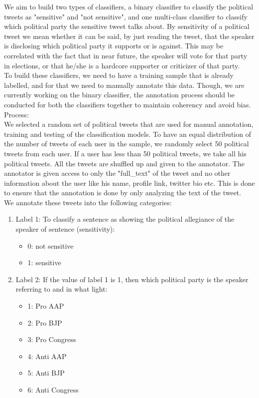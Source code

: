 \documentclass[a4paper,11pt]{article}
\begin{document}
We aim to build two types of classifiers, a binary classifier to classify the political tweets as "sensitive" and "not sensitive", and one multi-class classifier to classify which political party the sensitive tweet talks about. By sensitivity of a political tweet we mean whether it can be said, by just reading the tweet, that the speaker is disclosing which political party it supports or is against. This may be correlated with the fact that in near future, the speaker will vote for that party in elections, or that he/she is a hardcore supporter or criticizer of that party.
\medskip\\
To build these classifiers, we need to have a training sample that is already labelled, and for that we need to manually annotate this data. Though, we are currently working on the binary classifier, the annotation process should be conducted for both the classifiers together to maintain coherency and avoid bias.
\medskip\\
Process:
\medskip\\
We selected a random set of political tweets that are used for manual annotation, training and testing of the classification models. To have an equal distribution of the number of tweets of each user in the sample, we randomly select 50 political tweets from each user. If a user has less than 50 political tweets, we take all his political tweets. All the tweets are shuffled up and given to the annotator. The annotator is given access to only the "full\_text" of the tweet and no other information about the user like his name, profile link, twitter bio etc. This is done to ensure that the annotation is done by only analyzing the text of the tweet.\\
We annotate these tweets into the following categories:
\begin{enumerate}
    \item Label 1: To classify a sentence as showing the political allegiance of the speaker of sentence (sensitivity):
    \begin{itemize}
        \item 0: not sensitive
        \item 1: sensitive 
    \end{itemize}
    \item Label 2: If the value of label 1 is 1, then which political party is the speaker referring to and in what light:
    \begin{itemize}
        \item 1: Pro AAP
        \item 2: Pro BJP
        \item 3: Pro Congress
        \item 4: Anti AAP
        \item 5: Anti BJP
        \item 6: Anti Congress
    \end{itemize}
\end{enumerate}
\end{document}
